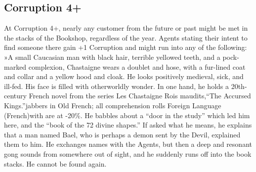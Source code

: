 \documentclass{report}
\begin{document}
\begin{multicols}{2}
\subsection{Corruption 4+}
At Corruption 4+, nearly any customer from the future or past might be met in the stacks of the Bookshop, regardless of the year. Agents stating their intent to find someone there gain +1 Corruption and might run into any of the following: »A small Caucasian man with black hair, terrible yellowed teeth, and a pock-marked complexion, Chastaigne wears a doublet and hose, with a fur-lined coat and collar and a yellow hood and cloak. He looks positively medieval, sick, and ill-fed. His face is filled with otherworldly wonder. In one hand, he holds a 20th-century French novel from the series Les   Chastaigne Rois maudits,“The Accursed Kings.”jabbers in Old French; all comprehension rolls Foreign Language (French)with  are at -20\%. He babbles about a “door in the study” which led him here, and the “book of the 72 divine shapes.” If asked what he means, he explains that a man named Bael, who is perhaps a demon sent by the Devil, explained them to him. He exchanges names with the Agents, but then a deep and resonant gong sounds from somewhere out of sight, and he suddenly runs off into the book stacks. He cannot be found again.\newpage

\end{multicols}
\end{document}
